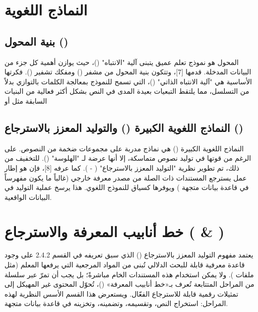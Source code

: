 \section{النماذج اللغوية}

\subsection{بنية المحول ()}

المحول هو نموذج تعلم عميق يتبنى آلية "الانتباه" ()، حيث يوازن أهمية كل جزء من البيانات المدخلة. قدمها [7]، وتتكون بنية المحول من مشفر () ومفكك تشفير (). فكرتها الأساسية هي "آلية الانتباه الذاتي" ()، التي تسمح للنموذج بمعالجة الكلمات بالتوازي بدلاً من التسلسل، مما يلتقط التبعيات بعيدة المدى في النص بشكل أكثر فعالية من البنيات السابقة مثل  أو 

\subsection{النماذج اللغوية الكبيرة () والتوليد المعزز بالاسترجاع ()}

النماذج اللغوية الكبيرة () هي نماذج مدربة على مجموعات ضخمة من النصوص. على الرغم من قوتها في توليد نصوص متماسكة، إلا أنها عرضة لـ "الهلوسة" (). للتخفيف من ذلك، تم تطوير نظرية "التوليد المعزز بالاسترجاع" ( - ). كما عرفه [8]، فإن  هو إطار عمل يسترجع المستندات ذات الصلة من مصدر معرفة خارجي (غالباً ما يكون مفهرساً في قاعدة بيانات متجهة ) ويوفرها كسياق للنموذج اللغوي. هذا يرسخ عملية التوليد في البيانات الواقعية.

\section{خط أنابيب المعرفة والاسترجاع ( \& )}
\label{sec:knowledge-pipeline}

يعتمد مفهوم التوليد المعزز بالاسترجاع () الذي سبق تعريفه في القسم 2.4.2 على وجود قاعدة معرفية قابلة للبحث الدلالي تُبنى من المواد المرجعية التي يرفعها المعلم (مثل ملفات ). ولا يمكن استخدام هذه المستندات الخام مباشرةً؛ بل يجب أن تمرّ عبر سلسلة من المراحل المتتابعة تُعرف بـ«خط أنابيب المعرفة» ()، تُحوّل المحتوى غير المهيكل إلى تمثيلات رقمية قابلة للاسترجاع الفعّال. ويستعرض هذا القسم الأسس النظرية لهذه المراحل: استخراج النص، وتقسيمه، وتضمينه، وتخزينه في قاعدة بيانات متجهة.

